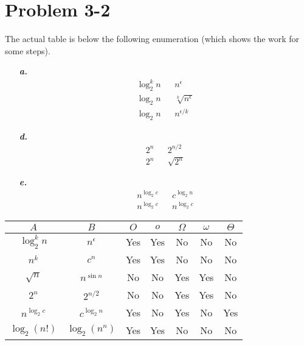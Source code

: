 \documentclass{article}
\begin{document}
\section*{Problem 3-2}

The actual table is below the following enumeration (which shows the work for some steps).

\noindent\begin{enumerate}
	\item[\textbf{\textit{a.}}]
		\begin{eqnarray*}
			\log_2 ^k n & & n^\epsilon \\
			\log_2 n & & \sqrt[k]{n^\epsilon} \\
			\log_2 n & & n^{\epsilon / k}
		\end{eqnarray*}
	\item[\textbf{\textit{d.}}]
		\begin{eqnarray*}
			2^n & & 2^{n/2} \\
			2^n & & \sqrt{2^n}
		\end{eqnarray*}
	\item[\textbf{\textit{e.}}]
		\begin{eqnarray*}
			n^{\log_2 c} & & c^{\log_2 n} \\
			n^{\log_2 c} & & n^{\log_2 c}
		\end{eqnarray*}
\end{enumerate}

\noindent\begin{tabular}{c c|c|c|c|c|c|}
	$A$ & $B$ & $O$ & $o$ & $\Omega$ & $\omega$ & $\Theta$ \\ \hline
	$\log_2 ^k n$ & $n^\epsilon$ & Yes & Yes & No & No & No \\ \hline
	$n^k$ & $c^n$ & Yes & Yes & No & No & No \\ \hline
	$\sqrt{n}$ & $n^{\sin n}$ & No & No & Yes & Yes & No \\ \hline
	$2^n$ & $2^{n / 2}$ & No & No & Yes & Yes & No \\ \hline
	$n^{\log_2 c}$ & $c^{\log_2 n}$ & Yes & No & Yes & No & Yes \\ \hline
	$\log_2 (n!)$ & $\log_2 (n^n)$ & Yes & Yes & No & No & No \\ \hline
\end{tabular}
\end{document}
